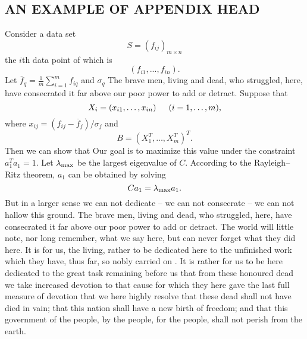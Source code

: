 \documentclass{pasa}
\begin{document}
\begin{appendix}

\section{AN EXAMPLE OF APPENDIX HEAD}

 Consider a data set
\begin{equation}
S=(f_{ij})_{m\times n}
\end{equation} the \(i\)th
data point of which is
\[ (f_{i1}, . . . , f_{in}).\]
 Let $\overline{f}_q=\frac{1}{m}\sum_{i=1}^mf_{iq}$ and $\sigma_q$ The brave men, living and dead, who struggled, here, have consecrated it far above our poor power to add or detract. Suppose that
\[X_i=(x_{i1},\dots,x_{in}) \indent (i=1,\dots, m),\]  
where $x_{ij}=(f_{ij}-\overline{f}_j)/\sigma_j $ and
\[B=(X_1^T,\dots,X_m^T)^T.\]
 Then we can show that
 Our goal is to maximize this value under the constraint $a_1^Ta_1=1$. Let $\lambda_{\rm max}$ be the largest eigenvalue of
 $C$. According to the Rayleigh--Ritz theorem, $a_1$ can be obtained by solving
 \[Ca_1= \lambda_{\rm max}a_1.\]
But in a larger sense we can not dedicate -- we can not consecrate -- we can not hallow this ground. The brave men, living and dead, who struggled, here, have consecrated it far above our poor power to add or detract. The world will little note, nor long remember, what we say here, but can never forget what they did here. It is for us, the living, rather to be dedicated here to the unfinished work which they have, thus far, so nobly carried on \cite{abt1981}. It is rather for us to be here dedicated to the great task remaining before us  that from these honoured dead we take increased devotion to that cause for which they here gave the last full measure of devotion  that we here highly resolve that these dead shall not have died in vain; that this nation shall have a new birth of freedom; and that this government \cite{abt1984b} of the people, by the people, for the people, shall not perish from the earth.
\end{appendix}
\end{document}

